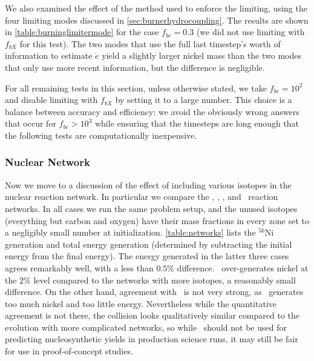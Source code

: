 \documentclass[12pt]{article}
\begin{document}
We also examined the effect of the method used to enforce the limiting, using the
four limiting modes discussed in \autoref{sec:burnerhydrocoupling}. The results are shown
in \autoref{table:burninglimitermode} for the case $f_{be} = 0.3$ (we did not use
limiting with $f_{bX}$ for this test). The two modes that use the full last timestep's
worth of information to estimate $\dot{e}$ yield a slightly larger nickel mass than the
two modes that only use more recent information, but the difference is negligible.



For all remaining tests in this section, unless otherwise stated, we take $f_{be} = 10^2$
and disable limiting with $f_{bX}$ by setting it to a large number. This choice is a balance
between accuracy and efficiency: we avoid the obviously wrong answers that occur for $f_{be} > 10^3$
while ensuring that the timesteps are long enough that the following tests are computationally
inexpensive.

\subsubsection{Nuclear Network}
\label{sec:collision_parameters:network}

Now we move to a discussion of the effect of including various isotopes
in the nuclear reaction network. In particular we compare the \isoseven, \aproxthirteen,
\aproxnineteen, and \aproxtwentyone\ reaction networks. In all cases we run
the same problem setup, and the unused isotopes (everything but carbon and oxygen)
have their mass fractions in every zone set to a negligibly small number at initialization.
\autoref{table:networks} lists the $^{56}$Ni generation and total energy generation (determined
by subtracting the initial energy from the final energy). The energy generated in the latter
three cases agrees remarkably well, with a less than $0.5\%$ difference. \aproxthirteen\
over-generates nickel at the $2\%$ level compared to the networks with more isotopes, a reasonably
small difference. On the other hand, agreement with \isoseven\ is not very strong, as \isoseven\
generates too much nickel and too little energy. Nevertheless while the quantitative
agreement is not there, the collision looks qualitatively similar compared to the evolution with
more complicated networks, so while \isoseven\ should not be used for predicting nucleosynthetic
yields in production science runs, it may still be fair for use in proof-of-concept studies.
\end{document}
